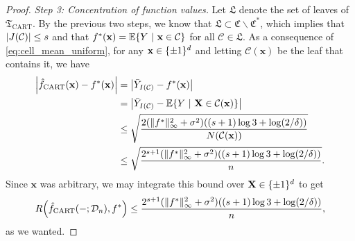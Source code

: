 \documentclass[11pt]{article}
\newcommand{\bx}{\mathbf{x}}
\newcommand{\bX}{\mathbf{X}}
\DeclarePairedDelimiter{\braces}{\lbrace}{\rbrace}
\DeclarePairedDelimiter{\paren}{(}{)}
\DeclarePairedDelimiter{\abs}{|}{|}
\DeclarePairedDelimiter{\norm}{\|}{\|}
\newcommand{\E}{\mathbb{E}}
\newcommand{\tree}{\mathfrak{T}}
\newcommand{\cell}{\mathcal{C}}
\newcommand{\leaves}{\mathfrak{L}}
\newcommand{\binspace}{\braces{\pm 1}^\nfeats}
\newcommand{\sparsity}{s}
\newcommand{\nfeats}{d}
\newcommand{\data}[1][n]{\mathcal{D}_{#1}}
\newcommand{\cellfeatindices}{J}
\newcommand{\cellsampindices}{I}
\newcommand{\fcart}{\hat{f}_{\operatorname{CART}}}
\newcommand{\cellcollection}{{\mathfrak{C}^*}}
\newcommand{\secondcellcollection}{\mathfrak{C}}
\begin{document}
\begin{proof}
    \textit{Step 3: Concentration of function values.}
    Let $\leaves$ denote the set of leaves of $\tree_{\operatorname{CART}}$.
    By the previous two steps, we know that $\leaves \subset \secondcellcollection\backslash \cellcollection$, which implies that $\abs*{\cellfeatindices(\cell)} \leq \sparsity$ and that $f^*(\bx) = \E\braces*{Y~|~\bx \in \cell}$ for all $\cell \in \leaves$.
    As a consequence of \eqref{eq:cell_mean_uniform}, for any $\bx \in \binspace$ and letting $\cell(\bx)$ be the leaf that contains it, we have
    \begin{equation}
        \begin{split}
            \abs*{\fcart(\bx) - f^*(\bx)} & = \abs*{\bar Y_{\cellsampindices(\cell)} - f^*(\bx)} \\
            & = \abs*{\bar Y_{\cellsampindices(\cell)} - \E\braces*{Y~|~\bX \in \cell(\bx)}} \\
            & \leq \sqrt{\frac{2(\norm{f^*}_\infty^2 + \sigma^2)\paren*{(s+1)\log 3 +\log(2/\delta)}}{N(\cell(\bx))}} \\
            & \leq \sqrt{\frac{2^{\sparsity+1}(\norm{f^*}_\infty^2 + \sigma^2)\paren*{(s+1)\log 3 +\log(2/\delta)}}{n}}.
        \end{split}
    \end{equation}
    Since $\bx$ was arbitrary, we may integrate this bound over $\bX \in \binspace$ to get
    \begin{equation}
        R\paren*{\fcart(-;\data),f^*} \leq \frac{2^{\sparsity+1}(\norm{f^*}_\infty^2 + \sigma^2)\paren*{(s+1)\log 3 +\log(2/\delta)}}{n},
    \end{equation}
    as we wanted.


\end{proof}
\end{document}
